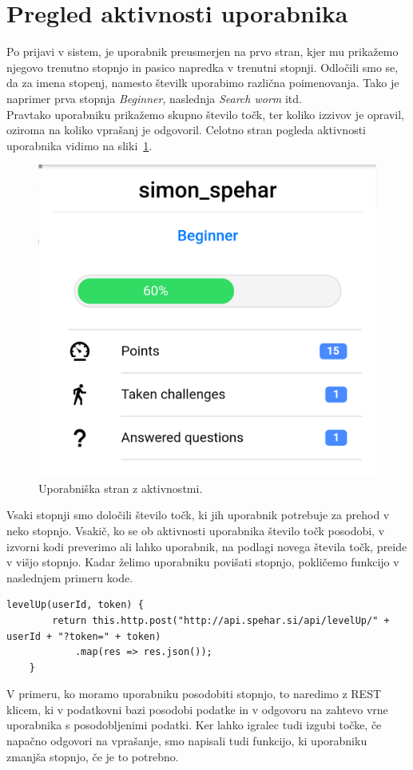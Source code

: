\documentclass[a4paper, 12pt]{book}
\begin{document}
\section{Pregled aktivnosti uporabnika}
Po prijavi v sistem, je uporabnik preusmerjen na prvo stran, kjer mu prikažemo njegovo trenutno stopnjo in pasico napredka v trenutni stopnji. Odločili smo se, da za imena stopenj, namesto številk uporabimo različna poimenovanja. Tako je naprimer prva stopnja \textit{Beginner}, naslednja \textit{Search worm} itd.\\Pravtako uporabniku prikažemo skupno število točk, ter koliko izzivov je opravil, oziroma na koliko vprašanj je odgovoril. Celotno stran pogleda aktivnosti uporabnika vidimo na sliki~\ref{profile}.
\begin{figure}[H]
\centering
\includegraphics[height=0.5\textwidth]{slike/profile}
\caption{Uporabniška stran z aktivnostmi.}\label{profile}
\end{figure}

\noindent Vsaki stopnji smo določili število točk, ki jih uporabnik potrebuje za prehod v neko stopnjo. Vsakič, ko se ob aktivnosti uporabnika število točk posodobi, v izvorni kodi preverimo ali lahko uporabnik, na podlagi novega števila točk, preide v višjo stopnjo. Kadar želimo uporabniku povišati stopnjo, pokličemo funkcijo v naslednjem primeru kode.
\begin{lstlisting}
levelUp(userId, token) {
        return this.http.post("http://api.spehar.si/api/levelUp/" + userId + "?token=" + token)
            .map(res => res.json());
    }
\end{lstlisting}
V primeru, ko moramo uporabniku posodobiti stopnjo, to naredimo z REST klicem, ki v podatkovni bazi posodobi podatke in v odgovoru na zahtevo vrne uporabnika s posodobljenimi podatki. Ker lahko igralec tudi izgubi točke, če napačno odgovori na vprašanje, smo napisali tudi funkcijo, ki uporabniku zmanjša stopnjo, če je to potrebno.
\end{document}
